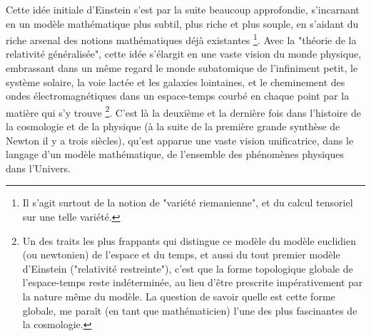 Cette idée initiale d'Einstein s'est par la suite beaucoup approfondie, s'incarnant en un modèle mathématique plus subtil, plus riche et plus souple, en s'aidant du riche arsenal des notions mathématiques déjà existantes \footnote{Il s'agit surtout de la notion de "variété riemanienne", et du calcul tensoriel sur une telle variété.}. Avec la "théorie de la relativité généralisée", cette idée s'élargit en une vaste vision du monde physique, embrassant dans un même regard le monde subatomique de l'infiniment petit, le système solaire, la voie lactée et les galaxies lointaines, et le cheminement des ondes électromagnétiques dans un espace-temps courbé en chaque point par la matière qui s'y trouve \footnote{Un des traits les plus frappants qui distingue ce modèle du modèle euclidien (ou newtonien) de l'espace et du temps, et aussi du tout premier modèle d'Einstein ("relativité restreinte"), c'est que la forme topologique globale de l'espace-temps reste indéterminée, au lieu d'être prescrite impérativement par la nature même du modèle. La question de savoir quelle est cette forme globale, me paraît (en tant que mathématicien) l'une des plus fascinantes de la cosmologie.}. C'est là la deuxième et la dernière fois dans l'histoire de la cosmologie et de la physique (à la suite de la première grande synthèse de Newton il y a trois siècles), qu'est apparue une vaste vision unificatrice, dans le langage d'un modèle mathématique, de l'ensemble des phénomènes physiques dans l'Univers.

